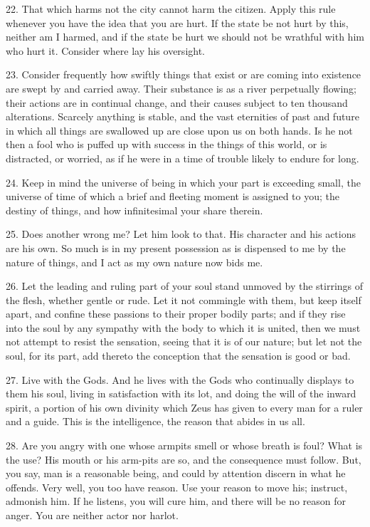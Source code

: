 \documentclass{book}
\begin{document}
22. That which harms not the city cannot harm the citizen. Apply this
rule whenever you have the idea that you are hurt. If the state be not
hurt by this, neither am I harmed, and if the state be hurt we should
not be wrathful with him who hurt it. Consider where lay his
oversight.

23. Consider frequently how swiftly things that exist or are coming
into existence are swept by and carried away. Their substance is as a
river perpetually flowing; their actions are in continual change, and
their causes subject to ten thousand alterations. Scarcely anything is
stable, and the vast eternities of past and future in which all things
are swallowed up are close upon us on both hands. Is he not then a
fool who is puffed up with success in the things of this world, or is
distracted, or worried, as if he were in a time of trouble likely to
endure for long.

24. Keep in mind the universe of being in which your part is exceeding
small, the universe of time of which a brief and fleeting moment is
assigned to you; the destiny of things, and how infinitesimal your
share therein.

25. Does another wrong me? Let him look to that. His character and his
actions are his own. So much is in my present possession as is
dispensed to me by the nature of things, and I act as my own nature
now bids me.

26. Let the leading and ruling part of your soul stand unmoved by the
stirrings of the flesh, whether gentle or rude. Let it not commingle
with them, but keep itself apart, and confine these passions to their
proper bodily parts; and if they rise into the soul by any sympathy
with the body to which it is united, then we must not attempt to
resist the sensation, seeing that it is of our nature; but let not the
soul, for its part, add thereto the conception that the sensation is
good or bad.

27. Live with the Gods. And he lives with the Gods who continually
displays to them his soul, living in satisfaction with its lot, and
doing the will of the inward spirit, a portion of his own divinity
which Zeus has given to every man for a ruler and a guide. This is the
intelligence, the reason that abides in us all.

28. Are you angry with one whose armpits smell or whose breath is
foul?  What is the use? His mouth or his arm-pits are so, and the
consequence must follow. But, you say, man is a reasonable being, and
could by attention discern in what he offends. Very well, you too have
reason. Use your reason to move his; instruct, admonish him. If he
listens, you will cure him, and there will be no reason for anger. You
are neither actor nor harlot.
\end{document}
